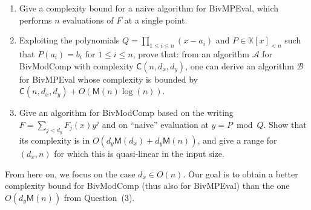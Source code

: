 \documentclass[11pt,a4paper,reqno]{amsart}
\newcommand{\hint}[2]{\noindent [\emph{#1}: #2]}
\newcommand{\field}{\mathbb{K}} %
\newcommand{\pring}{\field[x]} %
\newcommand{\bigO}[1]{O(#1)} %
\newcommand{\timepm}[1]{\mathsf{M}(#1)} %
\begin{document}
\begin{enumerate}
  \setlength\itemsep{2pt}
  \item

    Give a complexity bound for a naive algorithm for \textsf{BivMPEval}, which
    performs \(n\) evaluations of \(F\) at a single point.

  \item

    Exploiting the polynomials \(Q = \prod_{1\le i\le n} (x-a_i)\) and \(P \in
    \pring_{<n}\) such that \(P(a_i) = b_i\) for \(1\le i \le n\), prove that:
    from an algorithm \(\mathcal{A}\) for \textsf{BivModComp} with complexity
    \(\mathsf{C}(n,d_x,d_y)\), one can derive an algorithm \(\mathcal{B}\) for
    \textsf{BivMPEval} whose complexity is bounded by \(\mathsf{C}(n,d_x,d_y) +
    \bigO{\timepm{n}\log(n)}\).


  \item

    Give an algorithm for \textsf{BivModComp} based on the writing \(F =
    \sum_{j < d_y} F_j(x) y^j\) and on ``naive'' evaluation at \(y=P \bmod Q\).
    Show that its complexity is in \(\bigO{d_y \timepm{d_x} + d_y\timepm{n}}\),
    and give a range for \((d_x,n)\) for which this is quasi-linear in the
    input size.
\end{enumerate}

From here on, we focus on the case \(d_x \in \bigO{n}\). Our goal is to obtain
a better complexity bound for \textsf{BivModComp} (thus also for
\textsf{BivMPEval}) than the one \(\bigO{d_y\timepm{n}}\) from Question~(3).
\end{document}
